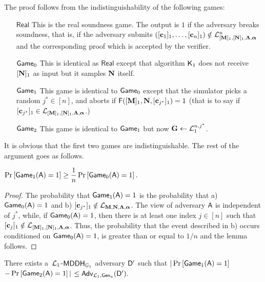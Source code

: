 The proof follows from the indistinguishability of the following games:
\begin{itemize}
\item[$\mathsf{Real}$] This is the real soundness game. The output is $1$ if the adversary breaks soundness, that is, if the adversary submits $([\mathbf{c}_1]_1,\ldots,[\mathbf{c}_n]_1)\notin\mathcal{L}_{[\mathbf{{M}}]_1,[\mathbf{{N}}]_1,\mathbf{{\Lambda}},{\boldsymbol \alpha}}^n$ and the corresponding proof which is accepted by the verifier.
\item[$\mathsf{Game}_0$] This is identical as $\mathsf{Real}$ except that algorithm $\mathsf{K}_1$ does not receive $[\mathbf{{N}}]_1$ as input but it samples $\mathbf{{N}}$ itself.
\item[$\mathsf{Game}_1$] This game is identical to $\mathsf{Game}_0$ except that the simulator picks a random $j^*\in[n]$, and 
aborts if $\mathsf{F}([\mathbf{{M}}]_1,\mathbf{{N}},[\mathbf{c}_{j^*}]_1)=1$ (that is to say if $[\mathbf{c}_{j^*}]_1 \in \mathcal{L}_{[\mathbf{{M}}]_1,[\mathbf{{N}}]_1,\mathbf{{\Lambda}},{\boldsymbol \alpha}}$.)
\item[$\mathsf{Game}_2$] This game is identical to $\mathsf{Game}_1$ but now $\mathbf{{G}} \gets \mathcal{L}_1^{n,j^*}$.
\end{itemize}

It is obvious that the first two games are indistinguishable. 
The rest of the argument goes as follows. 

\begin{lemma} $\Pr\left[ \mathsf{Game}_1(\mathsf{A})=1\right]\geq\dfrac{1}{n}\Pr\left[\mathsf{Game}_0(\mathsf{A})=1\right].$
\end{lemma}

\begin{proof}  The probability that
 $\mathsf{Game}_1(\mathsf{A})=1$ is the probability that  a) $\mathsf{Game}_0(\mathsf{A})=1$ and
b)  $[\mathbf{c}_{j^*}]_1 \notin \mathcal{L}_{\mathbf{{M}},\mathbf{{N}},\mathbf{{\Lambda}},{\boldsymbol \alpha}}$. The view of adversary $\mathsf{A}$ is independent of $j^*$, while, if $\mathsf{Game_0}(\mathsf{A})=1$, then there is at least one index $j \in [n]$ such that $[\mathbf{c}_{j}]_1 \notin \mathcal{L}_{[\mathbf{{M}}]_1,[\mathbf{{N}}]_1,\mathbf{{\Lambda}},{\boldsymbol \alpha}}$. Thus, 
the probability that the event described in b) occurs conditioned on $\mathsf{Game_0}(\mathsf{A})=1$, is greater than or equal to $1/n$ and the lemma follows.
\end{proof}

\begin{lemma} There exists a\ $\mathcal{L}_1$-$\mathsf{MDDH}_{\mathbb{G}_1}$ adversary $\mathsf{D}'$ such that
$|\Pr\left[\mathsf{Game}_{1}(\mathsf{A})=1\right]$ $-\Pr\left[\mathsf{Game}_{2}(\mathsf{A})=1\right]|$ $\leq
    \mathsf{Adv}_{\mathcal{L}_1,\mathsf{Gen}_a}(\mathsf{D}').$
\end{lemma}


